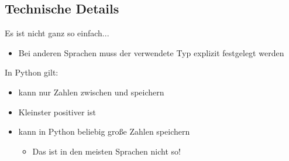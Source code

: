 	\subsection{Technische Details}
	\begin{frame} %
		\slidehead
		Es ist nicht ganz so einfach...

		\begin{itemize}
			\item Bei anderen Sprachen muss der verwendete Typ explizit festgelegt werden %
		\end{itemize}

		In Python gilt:
		\begin{itemize}
			\item {} kann nur Zahlen zwischen  und  speichern
			\item Kleinster positiver  ist 
			\item {} kann in Python beliebig große Zahlen speichern
			\begin{itemize}
				\item Das ist in den meisten Sprachen nicht so!
		\end{itemize}

		\end{itemize}
	\end{frame}





